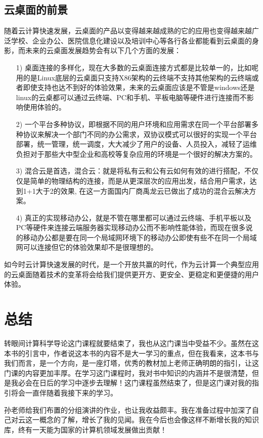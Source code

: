 \documentclass{article}
\begin{document}
\subsection{云桌面的前景}\par
随着云计算快速发展，云桌面的产品以变得越来越成熟的它的应用也变得越来越广泛学校、企业办公、医院信息化建设以及培训中心等各行各业都能看到云桌面的身影，而未来的云桌面发展趋势会有以下几个方面的发展：
\begin{itemize}
	\item [1) ]桌面连接的多样化，现在大多数的云桌面连接方式都是比较单一的，比如呢用的是Linux底层的云桌面只支持X86架构的云终端不支持其他架构的云终端或者即使支持也达不到好的体验效果，未来的云桌面应该是不管是windows还是linux的云桌都可以通过云终端、PC和手机、平板电脑等硬件进行连接而不影响使用体验的。
	\item [2) ]一个平台多种协议，即根据不同的用户环境和应用需求在同一个平台部署多种协议来解决一个部门不同的办公需求，双协议模式可以很好的实现一个平台部署，统一管理，统一调度，大大减少了用户的设备、人员投入，减轻了运维负担对于那些大中型企业和高校等复杂应用的环境是一个很好的解决方案的。
	\item [3) ]混合云是首选，混合云：就是将私有云和公有云如何有效的进行搭配，不仅仅是简单的物理结构的连接，而是从更深层次的应用出发，结合用户需求，达到1+1大于2的效果, 在这一方面国内厂商禹龙云已做出了成功的混合云解决方案。
	\item [4) ]真正的实现移动办公，就是不管在哪里都可以通过云终端、手机平板以及PC等硬件来连接云端服务器实现移动办公而不影响性能体验，而现在很多说的移动办公都是要在同一个局域网环境下的移动办公即使有些不在同一个局域网可以连接但它的体验效果却不是很理想的。
\end{itemize}\par	
	如今时云计算快速发展的时代，是一个开放共赢的时代，作为云计算一个典型应用的云桌面随着技术的变革将会给我们提供更开方、更安全、更稳定和更便捷的用户体验。
	
	
\section{总结}	
转眼间计算科学导论这门课程就要结束了，我也从这门课当中受益不少。虽然在这本书的引言中，作者说这本书的内容不是大一学习的重点，但在我看来，这本书与我们而言，是一个方向，是一座灯塔，优秀的教材加上老师正确明朗的指引，让这门课的内容更加丰厚。在学习这门课程时，我对书中知识的内涵并不是很清楚，但是我必会在日后的学习中逐步去理解！这门课程虽然结束了，但是这门课对我的指引将会一直伴随着我接下来的学习。\par
孙老师给我们布置的分组演讲的作业，也让我收益颇丰。我在准备过程中加深了自己对云这一概念的了解，增长了我的见闻。我在今后也会像这样不断增长我的知识库，终有一天能为国家的计算机领域发展做出贡献！\par
\end{document}
